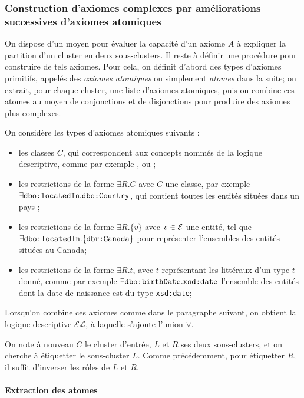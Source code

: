 \subsubsection{Construction d'axiomes complexes par améliorations successives d'axiomes atomiques}

On dispose d'un moyen pour évaluer la capacité d'un axiome $A$ à expliquer la partition d'un cluster en deux sous-clusters. Il reste à définir une procédure pour construire de tels axiomes. Pour cela, on définit d'abord des types d'axiomes primitifs, appelés des \textit{axiomes atomiques} ou simplement \textit{atomes} dans la suite; on extrait, pour chaque cluster, une liste d'axiomes atomiques, puis on combine ces atomes au moyen de conjonctions et de disjonctions pour produire des axiomes plus complexes.

On considère les types d'axiomes atomiques suivants :
\begin{itemize}
    \item les classes $C$, qui correspondent aux concepts nommés de la logique descriptive, comme par exemple ,  ou ;
    \item les restrictions de la forme $\exists R.C$ avec $C$ une classe, par exemple $\exists \texttt{dbo:locatedIn}.\allowbreak \texttt{dbo:Country}$, qui contient toutes les entités situées dans un pays ;
    \item les restrictions de la forme $\exists R.\{v\}$ avec $v \in \mathcal{E}$ une entité, tel que $\exists \texttt{dbo:locatedIn}.\allowbreak \{\texttt{dbr:Canada}\}$ pour représenter l'ensembles des entités situées au Canada;
    \item les restrictions de la forme $\exists R.t$, avec $t$ représentant les littéraux d'un type $t$ donné, comme par exemple $\exists \texttt{dbo:birthDate}.\texttt{xsd:date}$ l'ensemble des entités dont la date de naissance est du type \texttt{xsd:date};
\end{itemize}
Lorsqu'on combine ces axiomes comme dans le paragraphe suivant, on obtient la logique descriptive $\mathcal{EL}$, à laquelle s'ajoute l'union $\lor$.

On note à nouveau $C$ le cluster d'entrée,  $L$ et $R$ ses deux sous-clusters, et on cherche à étiquetter le sous-cluster $L$. Comme précédemment, pour étiquetter $R$, il suffit d'inverser les rôles de $L$ et $R$.

\paragraph{Extraction des atomes}

